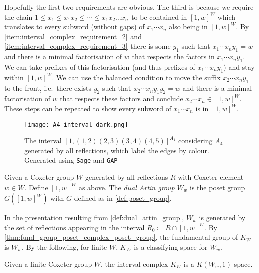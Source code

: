 \documentclass[class=article, crop=false]{standalone}
\begin{document}
Hopefully the first two requirements are obvious. The third is because we require the chain $1 \leq x_1 \leq x_1x_2 \leq \cdots \leq x_1x_2\ldots x_{n}$ to be contained in $[1,w]^W$ which translates to every subword (without gaps) of $x_1\cdots x_n$ also being in $[1,w]^W$. By \eqref{item:interval_complex_requirement_2} and \eqref{item:interval_complex_requirement_3} there is some $y_1$ such that $x_1 \cdots x_n y_1 = w$ and there is a minimal factorisation of $w$ that respects the factors in $ x_1 \cdots x_n y_1$.
We can take prefixes of this factorisation (and thus prefixes of $ x_1 \cdots x_n y_1$) and stay within $[1,w]^W$. We can use the balanced condition to move the suffix $x_2\cdots x_n y_1$ to the front, i.e.~there exists $y_2$ such that $x_2\cdots x_n y_1y_2=w$ and there is a minimal factorisation of $w$ that respects these factors and conclude $x_2\cdots x_n \in [1,w]^W$. These steps can be repeated to show every subword of $x_1 \cdots x_n $ is in $[1,w]^W$.

\begin{figure}
	\centering
	\texttt{[image: A4\_interval\_dark.png]}
	\caption{The interval $[1, (1,2)(2,3)(3,4)(4,5)]^{A_4}$ considering $A_4$ generated by all reflections, which label the edges by colour. Generated using \texttt{Sage} and \texttt{GAP} \cite{sagemath_2020, gap_2022}}
	\label{fig:A4_interval}
\end{figure}

\begin{definition}
    Given a Coxeter group $W$ generated by all reflections $R$ with Coxeter element $w \in W$. Define $[1,w]^W$ as above. The \emph{dual Artin group} $W_w$ is the poset group $G([1,w]^W)$ with $G$ defined as in \cref{def:poset_group}.
    \label{def:dual_artin_group}
\end{definition}

In the presentation resulting from \cref{def:dual_artin_group}, $W_w$ is generated by the set of reflections appearing in the interval $R_0 \coloneq R \cap [1,w]^W$.
By \cref{thm:fund_group_poset_complex_poset_group}, the fundamental group of $K_{W}$ is $W_w$. By the following, for finite $W$, $K_W$ is a classifying space for $W_w$.

\begin{theorem}
    Given a finite Coxeter group $W$, the interval complex $K_W$ is a $K(W_w,1)$ space.
    \label{thm:interval_cx_k_pi_1_finite}
\end{theorem}
\end{document}
